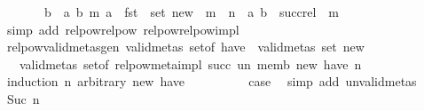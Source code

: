 \begin{isabellebody}
\ \ \ \ \ \ {\isacharequal}{\kern0pt}\ {\isacharbraceleft}{\kern0pt}b\ {\isacharbar}{\kern0pt}\ a\ b\ m{\isachardot}{\kern0pt}\ a\ {\isasymin}\ fst\ {\isacharbackquote}{\kern0pt}\ set\ new\ {\isasymand}\ m\ {\isasymle}\ n\ {\isasymand}\ {\isacharparenleft}{\kern0pt}a{\isacharcomma}{\kern0pt}\ b{\isacharparenright}{\kern0pt}\ {\isasymin}\ succ{\isacharunderscore}{\kern0pt}rel\ {\isacharcircum}{\kern0pt}{\isacharcircum}{\kern0pt}\ m{\isacharbraceright}{\kern0pt}{\isachardoublequoteclose}\isanewline
%
\isadelimproof
\ \ %
\endisadelimproof
%
\isatagproof
{}\isamarkupfalse%
\ {\isacharparenleft}{\kern0pt}simp\ add{\isacharcolon}{\kern0pt}\ relpow{\isacharunderscore}{\kern0pt}relpow{\isacharprime}{\kern0pt}\ relpow{\isacharprime}{\kern0pt}{\isachardot}{\kern0pt}relpow{\isacharunderscore}{\kern0pt}impl{\isacharparenright}{\kern0pt}%
\endisatagproof
{\isafoldproof}%
%
\isadelimproof
\isanewline
%
\endisadelimproof
\isanewline
\isanewline
\isanewline
{}\isamarkupfalse%
\ relpow{\isacharunderscore}{\kern0pt}valid{\isacharunderscore}{\kern0pt}metas{\isacharunderscore}{\kern0pt}gen{\isacharcolon}{\kern0pt}\ {\isachardoublequoteopen}valid{\isacharunderscore}{\kern0pt}metas\ {\isacharparenleft}{\kern0pt}set{\isacharunderscore}{\kern0pt}of\ have{\isacharparenright}{\kern0pt}\ {\isasymLongrightarrow}\ valid{\isacharunderscore}{\kern0pt}metas\ {\isacharparenleft}{\kern0pt}set\ new{\isacharparenright}{\kern0pt}\isanewline
\ \ {\isasymLongrightarrow}\ valid{\isacharunderscore}{\kern0pt}metas\ {\isacharparenleft}{\kern0pt}set{\isacharunderscore}{\kern0pt}of\ {\isacharparenleft}{\kern0pt}relpow{\isacharunderscore}{\kern0pt}meta{\isacharunderscore}{\kern0pt}impl\ succ\ un\ memb\ new\ have\ n{\isacharparenright}{\kern0pt}{\isacharparenright}{\kern0pt}{\isachardoublequoteclose}\isanewline
%
\isadelimproof
%
\endisadelimproof
%
\isatagproof
{}\isamarkupfalse%
\ {\isacharparenleft}{\kern0pt}induction\ n\ arbitrary{\isacharcolon}{\kern0pt}\ new\ {\isachardoublequoteopen}have{\isachardoublequoteclose}{\isacharparenright}{\kern0pt}\isanewline
\ \ \isamarkupfalse%
\ {}\isanewline
\ \ \isamarkupfalse%
\ \isamarkupfalse%
\ {\isacharquery}{\kern0pt}case\ \isamarkupfalse%
\ {\isacharparenleft}{\kern0pt}simp\ add{\isacharcolon}{\kern0pt}\ un{\isacharunderscore}{\kern0pt}valid{\isacharunderscore}{\kern0pt}metas{\isacharparenright}{\kern0pt}\isanewline
{}\isamarkupfalse%
\isanewline
\ \ \isamarkupfalse%
\ {\isacharparenleft}{\kern0pt}Suc\ n{\isacharparenright}{\kern0pt}\isanewline

\end{isabellebody}

